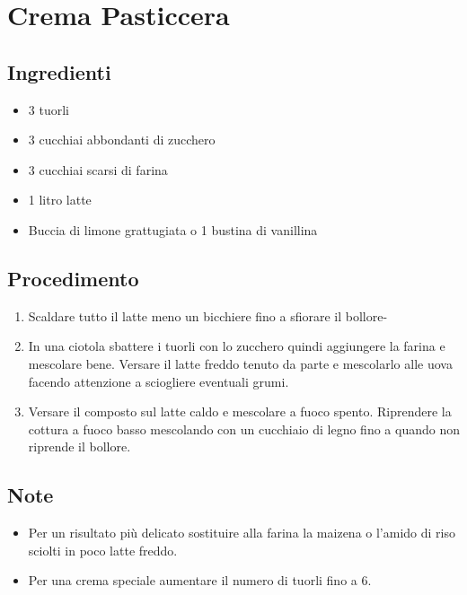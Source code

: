 \section{Crema Pasticcera}
\subsection{Ingredienti}
\begin{itemize}
\item 3 tuorli  
\item 3 cucchiai abbondanti di zucchero   
\item 3 cucchiai scarsi di farina   
\item 1 litro latte  
\item Buccia di limone grattugiata o 1 bustina di vanillina
\end{itemize}
\subsection{Procedimento}
\begin{enumerate}
\item  Scaldare tutto il latte meno un bicchiere fino a sfiorare il bollore-  
\item  In una ciotola sbattere i tuorli con lo zucchero quindi aggiungere la farina e mescolare bene. Versare il latte freddo tenuto da parte e mescolarlo alle uova facendo attenzione a sciogliere eventuali grumi.  
\item  Versare il composto sul latte caldo e mescolare a fuoco spento. Riprendere la cottura a fuoco basso mescolando con un cucchiaio di legno fino a quando non riprende il bollore.
\end{enumerate}
\subsection{Note}
\begin{itemize}
\item Per un risultato più delicato sostituire alla farina la maizena o l'amido di riso sciolti in poco latte freddo.  
\item Per una crema speciale aumentare il numero di tuorli fino a 6.
\end{itemize}
